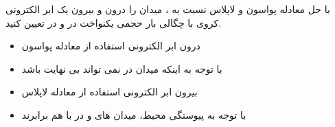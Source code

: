 
\begin{ELexample}{}

با حل معادله پواسون و لاپلاس نسبت به ، میدان  را درون و بیرون یک ابر الکترونی کروی با چگالی بار حجمی یکنواخت  در  و  در  تعیین کنید.

\begin{ELsolution}

\begin{itemize}
\tightlist
\item
  درون ابر الکترونی \ELim{\ELto} استفاده از معادله پواسون
\end{itemize}


\begin{itemize}
\tightlist
\item
  با توجه به اینکه میدان در  نمی تواند بی نهایت باشد
\end{itemize}


\begin{itemize}
\tightlist
\item
  بیرون ابر الکترونی \ELim{\ELto} استفاده از معادله لاپلاس
\end{itemize}


\begin{itemize}
\tightlist
\item
  با توجه به پیوستگی محیط، میدان های  و  در  با هم برابرند
\end{itemize}


\end{ELsolution}

\end{ELexample}


